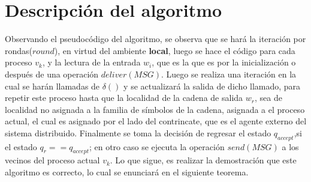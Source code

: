 \documentclass[10pt]{report}
\begin{document}
    \section{Descripción del algoritmo}\label{sec:descripción-del-algoritmo}
    Observando el pseudocódigo del algoritmo, se observa que se hará la iteración por rondas($round$), en
    virtud del ambiente \textbf{local}, luego se hace el código para cada proceso $v_{k}$, y la lectura de
    la entrada $w_{i}$, que es la que es por la inicialización o después de una operación $deliver(MSG)$.
    \newline
    Luego se realiza una iteración en la cual se harán llamadas de $\delta()$ y se actualizará la salida de dicho llamado, para repetir este
    proceso hasta que la localidad de la cadena de salida $w_{r}$, sea de localidad no asignada a la familia de símbolos
    de la cadena, asignada a el proceso actual, el cual es asignado por el lado del contrincate, que es el agente externo del sistema distribuido.
    \newline
    Finalmente se toma la decisión de regresar el estado $q_{accept}$,si el estado $q_{r}==q_{accept}$;
    en otro caso se ejecuta la operación $send(MSG)$ a los vecinos del proceso actual $v_{k}$.
    \newline
    Lo que sigue, es realizar la demostración que este algoritmo es correcto, lo cual se enunciará en el siguiente teorema.
    \newline
\end{document}
